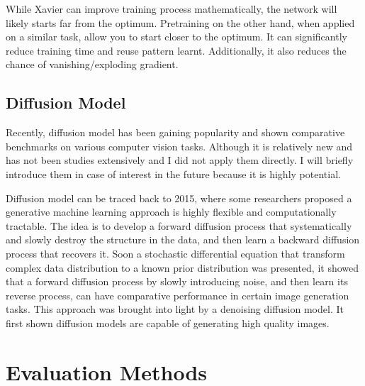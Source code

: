While Xavier can improve training process mathematically, the network will likely starts far from the optimum. Pretraining on the other hand, when applied on a similar task, allow you to start closer to the optimum. It can significantly reduce training time and reuse pattern learnt. Additionally, it also reduces the chance of vanishing/exploding gradient.



\subsection{Diffusion Model}
Recently, diffusion model has been gaining popularity and shown comparative benchmarks on various computer vision tasks\cite{sahariaPaletteImagetoImageDiffusion2022, dhariwalDiffusionModelsBeat2021}. Although it is relatively new and has not been studies extensively and I did not apply them directly. I will briefly introduce them in case of interest in the future because it is highly potential.

Diffusion model can be traced back to 2015, where some researchers proposed a generative machine learning approach is highly flexible and computationally tractable\cite{sohl-dicksteinDeepUnsupervisedLearning2015}. The idea is to develop a forward diffusion process that systematically and slowly destroy the structure in the data, and then learn a backward diffusion process that recovers it. Soon a stochastic differential equation that transform complex data distribution to a known prior distribution was presented, it showed that a forward diffusion process by slowly introducing noise, and then learn its reverse process, can have comparative performance in certain image generation tasks\cite{songScoreBasedGenerativeModeling2021}. This approach was brought into light by a denoising diffusion model\cite{hoDenoisingDiffusionProbabilistic2020}. It first shown diffusion models are capable of generating high quality images.



\section{Evaluation Methods}


